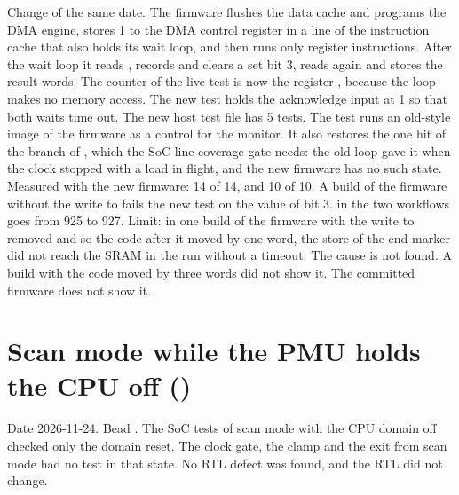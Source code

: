 \begin{record}

Change of the same date. The firmware flushes the data cache and programs the DMA engine, stores 1 to the DMA control register in a line of the instruction cache that also holds its wait loop, and then runs only register instructions. After the wait loop it reads , records and clears a set bit 3, reads  again and stores the result words. The counter of the live test is now the register , because the loop makes no memory access. The new test  holds the acknowledge input at 1 so that both waits time out. The new host test file  has 5 tests. The test  runs an old-style image of the firmware as a control for the monitor. It also restores the one hit of the  branch of , which the SoC line coverage gate needs: the old loop gave it when the clock stopped with a load in flight, and the new firmware has no such state. Measured with the new firmware:  14 of 14,  and  10 of 10. A build of the firmware without the write to  fails the new test on the value of  bit 3.  in the two workflows goes from 925 to 927. Limit: in one build of the firmware with the write to  removed and so the code after it moved by one word, the store of the end marker did not reach the SRAM in the run without a timeout. The cause is not found. A build with the code moved by three words did not show it. The committed firmware does not show it.

\end{record}

\section{Scan mode while the PMU holds the CPU off ()}\label{cr:defect:scan-with-cpu-off}

\begin{record}

Date 2026-11-24. Bead . The SoC tests of scan mode with the CPU domain off checked only the domain reset. The clock gate, the clamp and the exit from scan mode had no test in that state. No RTL defect was found, and the RTL did not change.

\end{record}


